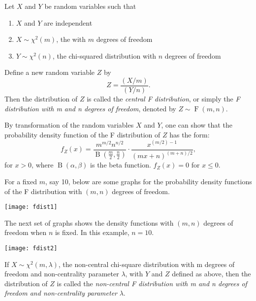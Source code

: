 \documentclass[12pt]{article}
\begin{document}
Let $X$ and $Y$ be random variables such that
\begin{enumerate}
\item $X$ and $Y$ are independent
\item $X\sim \chi^2(m)$, the  with $m$ degrees of freedom
\item $Y\sim \chi^2(n)$, the chi-squared distribution with $n$ degrees of freedom
\end{enumerate}
Define a new random variable $Z$ by
$$Z=\frac{(X/m)}{(Y/n)}.$$
Then the distribution of $Z$ is called the \emph{central F distribution}, or simply the \emph{F distribution with m and n degrees of freedom}, denoted by $Z\sim \operatorname{F}(m,n)$.

By transformation of the random variables $X$ and $Y$, one can show that the probability density function of the F distribution of $Z$ has the form:
$$f_Z(x)=\frac{m^{m/2}n^{n/2}}{\operatorname{B}(\frac{m}{2},\frac{n}{2})}
\cdot\frac{x^{(m/2)-1}}{(mx+n)^{(m+n)/2}},$$
for $x>0$, where $\operatorname{B}(\alpha,\beta)$ is the beta function.  $f_Z(x)=0$ for $x\le 0$.

For a fixed $m$, say 10, below are some graphs for the probability density functions of the F distribution with $(m,n)$ degrees of freedom.

\begin{center}
\texttt{[image: fdist1]}
\end{center}

The next set of graphs shows the density functions with $(m,n)$ degrees of freedom when $n$ is fixed.  In this example, $n=10$.

\begin{center}
\texttt{[image: fdist2]}
\end{center}

If $X\sim \chi^2(m,\lambda)$, the non-central chi-square distribution with m degrees of freedom and non-centrality parameter $\lambda$, with $Y$ and $Z$ defined as above, then the distribution of $Z$ is called the \emph{non-central 
F distribution with m and n degrees of freedom and non-centrality parameter} $\lambda$.
\end{document}
